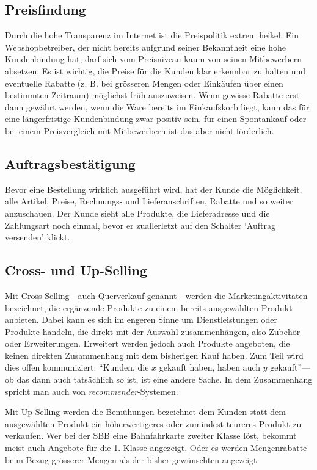 \subsection{Preisfindung}

Durch die hohe Transparenz im Internet ist die Preispolitik extrem heikel.
Ein Webshopbetreiber, der nicht bereits aufgrund seiner Bekanntheit eine
hohe Kundenbindung hat, darf sich vom Preisniveau kaum von seinen Mitbewerbern
absetzen. Es ist wichtig, die Preise für die Kunden klar erkennbar zu halten
und eventuelle Rabatte (z. B. bei grösseren Mengen oder Einkäufen über einen
bestimmten Zeitraum) möglichst früh auszuweisen. Wenn gewisse Rabatte erst
dann gewährt werden, wenn die Ware bereits im Einkaufskorb liegt, kann das für
eine längerfristige Kundenbindung zwar positiv sein, für einen Spontankauf
oder bei einem Preisvergleich mit Mitbewerbern ist das aber nicht förderlich.

\subsection{Auftragsbestätigung}

Bevor eine Bestellung wirklich ausgeführt wird, hat der Kunde die Möglichkeit,
alle Artikel, Preise, Rechnungs- und Lieferanschriften, Rabatte und so weiter
anzuschauen. Der Kunde sieht alle Produkte, die Lieferadresse und die Zahlungsart
noch einmal, bevor er zuallerletzt auf den Schalter `Auftrag versenden' klickt.

\subsection{Cross- und Up-Selling}

Mit Cross-Selling---auch Querverkauf genannt---werden die Marketingaktivitäten
bezeichnet, die ergänzende Produkte zu einem bereits ausgewählten Produkt
anbieten. Dabei kann es sich im engeren Sinne um Dienstleistungen oder
Produkte handeln, die direkt mit der Auswahl zusammenhängen, also Zubehör
oder Erweiterungen. Erweitert werden jedoch auch Produkte angeboten, die
keinen direkten Zusammenhang mit dem bisherigen Kauf haben. Zum Teil wird
dies offen kommuniziert: ``Kunden, die $x$ gekauft haben, haben auch $y$
gekauft''---ob das dann auch tatsächlich so ist, ist eine andere Sache.
In dem Zusammenhang spricht man auch von \emph{recommender}-Systemen.

Mit Up-Selling werden die Bemühungen bezeichnet dem Kunden statt dem
ausgewählten Produkt ein höherwertigeres oder zumindest teureres Produkt
zu verkaufen. Wer bei der SBB eine Bahnfahrkarte zweiter Klasse löst,
bekommt meist auch Angebote für die 1. Klasse angezeigt. Oder es werden
Mengenrabatte beim Bezug grösserer Mengen als der bisher gewünschten angezeigt.

